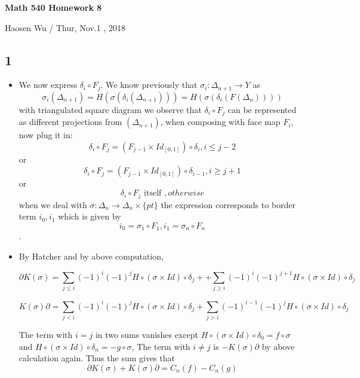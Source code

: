 \documentclass[11pt]{article}
\def\p{\partial}
\theoremstyle{remark}
\begin{document}
\begin{center}
    \begin{Large} {\bf Math 540 Homework 8}\\
    \end{Large}
    Haosen Wu  / Thur, Nov.1 , 2018
\end{center}

\subsection*{1}
\begin{itemize}
    \item  We now express  $\delta_i\circ F_j$. We know previously that $\sigma_i:\Delta_{n+1} \rightarrow Y$ as $$\sigma_i(\Delta_{n+1})=H(\sigma(\delta_i(\Delta_{n+1})))=H(\sigma(\delta_i(F(\Delta_{n}))))$$ with triangulated square diagram we observe that $\delta_i\circ F_j$ can be represented as different projections from $(\Delta_{n+1})$, when composing with face map $F_i$, now plug it in: $$\delta_i\circ F_j= (F_{j-1}\times Id_{[0,1]})\circ \delta_{i}, i\leq j-2$$  or $$\delta_i\circ F_j= (F_{j-1}\times Id_{[0,1]})\circ \delta_{i-1}, i \geq j+1$$ or $$\delta_i\circ F_j\textrm{ itself },otherwise$$ when we deal with  $\sigma: \Delta_{n} \rightarrow \Delta_{n}\times \{pt\}$ the expression corresponds to border term $i_0,i_1$ which is given by $$i_0=\sigma_1\circ F_{1},i_1=\sigma_n\circ F_{n}$$. 
    
    \item By Hatcher and by above computation, 
    
    $$\p K(\sigma)=\sum_{j\leq i} (-1)^i(-1)^j H\circ (\sigma\times Id)\circ \delta_{j}+
    +\sum_{j\geq i} (-1)^i(-1)^{j+1} H\circ (\sigma\times Id)\circ \delta_{j}$$
    
    $$K(\sigma)\p =\sum_{j< i} (-1)^i(-1)^j H\circ (\sigma\times Id)\circ \delta_{j}
    +\sum_{j> i} (-1)^{i-1}(-1)^j H\circ (\sigma\times Id)\circ \delta_{j}$$
    
    The term with $i=j$ in two sums vanishes except $H\circ (\sigma\times Id)\circ \delta_{0}=f\circ\sigma$ and $H\circ (\sigma\times Id)\circ \delta_{n}=-g\circ\sigma$, The term with $i\not= j$ is $-K(\sigma)\p$ by above calculation again. Thus the sum gives that $$\p  K(\sigma)+K(\sigma)\p=C_n(f)-C_n(g)$$
    
    \end{itemize}
    
\end{document}
